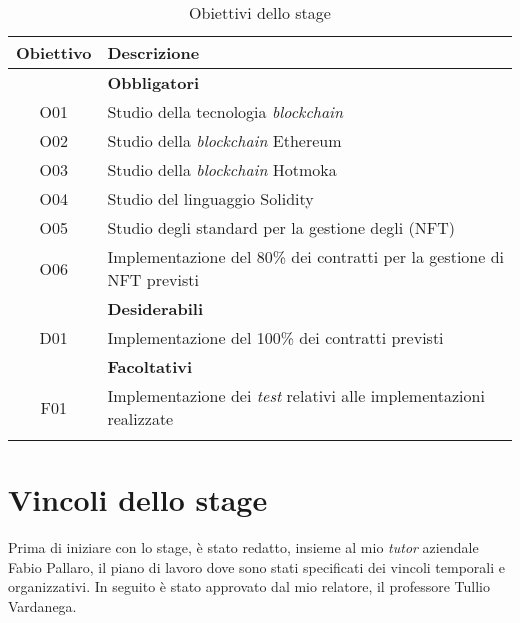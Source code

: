\begin{longtable}{|c|l|}  
  \hline

  \textbf{Obiettivo} & \textbf{Descrizione} \\ \hline

            & \textbf{Obbligatori} \\

  O01       & Studio della tecnologia \emph{blockchain} \\
  O02       & Studio della \emph{blockchain} Ethereum \\
  O03       & Studio della \emph{blockchain} Hotmoka \\ 
  O04       & Studio del linguaggio Solidity \\ 
  O05       & Studio degli standard per la gestione degli (NFT) \\ 
  O06       & Implementazione del 80\% dei contratti per la gestione di NFT previsti \\
  
  \hline
            & \textbf{Desiderabili} \\
  
  D01       & Implementazione del 100\% dei contratti previsti \\

  \hline

            & \textbf{Facoltativi} \\

  F01       & Implementazione dei \emph{test} relativi alle implementazioni realizzate \\

  \hline

  \caption{Obiettivi dello stage}

\end{longtable}


\section{Vincoli dello stage}
Prima di iniziare con lo stage, è stato redatto, insieme al mio \emph{tutor} aziendale Fabio Pallaro, il piano di lavoro dove sono stati specificati dei vincoli temporali e organizzativi. In seguito è stato approvato dal mio relatore, il professore Tullio Vardanega.

